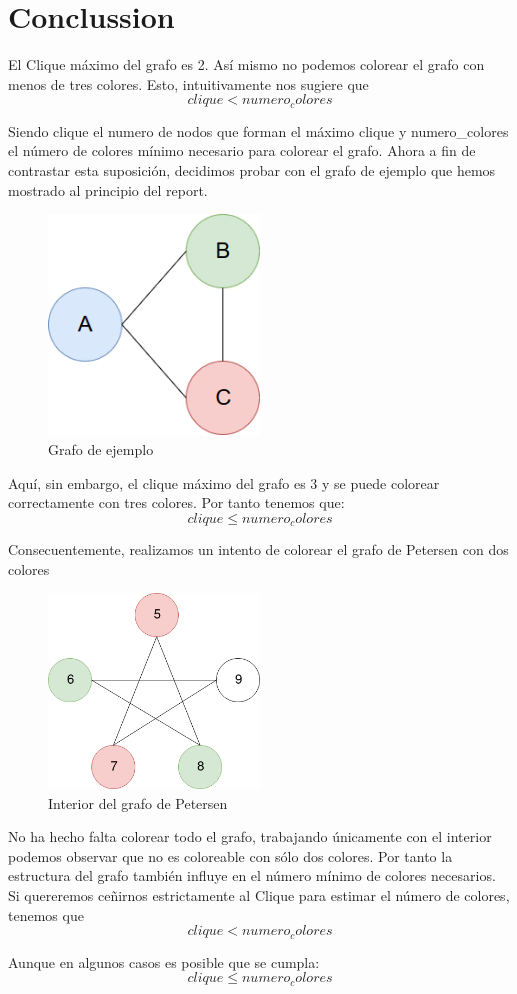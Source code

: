 \documentclass{article}
\begin{document}
\section{Conclussion}
El Clique máximo del grafo es 2. Así mismo no podemos colorear el grafo con menos de tres colores. Esto, intuitivamente nos sugiere que 
    \[clique < numero_colores\]

Siendo clique el numero de nodos que forman el máximo clique y numero\_colores el número 
de colores mínimo necesario para colorear el grafo. Ahora a 
fin de contrastar esta suposición, decidimos probar con el grafo de ejemplo que hemos mostrado al principio del report. 
\begin{figure}[H]
    \centering
    \includegraphics[width=0.5\textwidth]{pictures/ejemplo.png}
    \caption{Grafo de ejemplo}
\end{figure}

Aquí, sin embargo, el clique máximo del grafo es 3 y se puede colorear correctamente con tres colores. Por tanto tenemos que:
    \[clique \leq numero_colores\]
    
Consecuentemente, realizamos un intento de colorear el grafo de Petersen con dos colores 
\begin{figure}[H]
    \centering
    \includegraphics[width=0.5\textwidth]{pictures/interior.png}
    \caption{Interior del grafo de Petersen}
\end{figure}

No ha hecho falta colorear todo el grafo, trabajando únicamente con el interior podemos observar que no es coloreable con sólo dos colores.  
Por tanto la estructura del grafo también influye en el número mínimo de colores necesarios. Si quereremos ceñirnos estrictamente al Clique 
para estimar el número de colores, tenemos que 
    \[clique < numero_colores \] 

Aunque en algunos casos es posible que se cumpla: 
    \[clique \leq numero_colores\]
    
 

\end{document}
